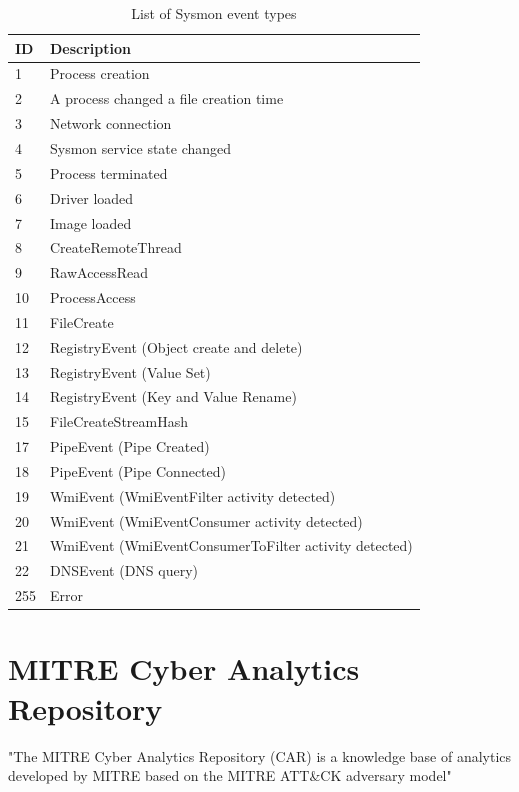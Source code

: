 \begin{table}[ht]
\begin{tabular}{l|l}
ID & Description \\ \hline
1 & Process creation \\
2 & A process changed a file creation time \\
3 & Network connection \\
4 & Sysmon service state changed \\
5 & Process terminated \\
6 & Driver loaded \\
7 & Image loaded \\
8 & CreateRemoteThread \\
9 & RawAccessRead \\
10 & ProcessAccess \\
11 & FileCreate \\
12 & RegistryEvent (Object create and delete) \\
13 & RegistryEvent (Value Set) \\
14 & RegistryEvent (Key and Value Rename) \\
15 & FileCreateStreamHash \\
17 & PipeEvent (Pipe Created) \\
18 & PipeEvent (Pipe Connected) \\
19 & WmiEvent (WmiEventFilter activity detected) \\
20 & WmiEvent (WmiEventConsumer activity detected) \\
21 & WmiEvent (WmiEventConsumerToFilter activity detected) \\
22 & DNSEvent (DNS query) \\
255 & Error
\end{tabular}
\caption{List of Sysmon event types}
\label{tab:sysmoneventtypes}
\end{table}

\section{MITRE Cyber Analytics Repository}
"The MITRE Cyber Analytics Repository (CAR) is a knowledge base of analytics developed by MITRE based on the MITRE ATT\&CK adversary model"

